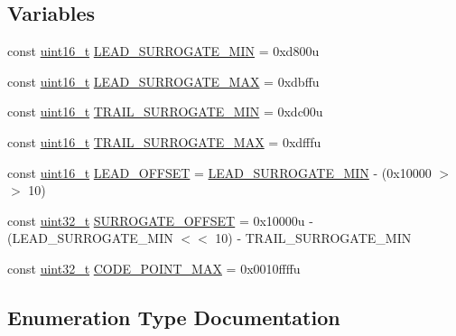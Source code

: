 \subsection*{Variables}
\begin{DoxyCompactItemize}
\item 
const \hyperlink{namespaceutf8_ac23066b92c5a1d9d9ef177201f750936}{uint16\+\_\+t} \hyperlink{namespaceutf8_1_1internal_aca9d84aa3b40e635b086c9ce843cc4a4}{L\+E\+A\+D\+\_\+\+S\+U\+R\+R\+O\+G\+A\+T\+E\+\_\+\+M\+IN} = 0xd800u
\item 
const \hyperlink{namespaceutf8_ac23066b92c5a1d9d9ef177201f750936}{uint16\+\_\+t} \hyperlink{namespaceutf8_1_1internal_af6038b4ebd9b71391eba050cc29720b8}{L\+E\+A\+D\+\_\+\+S\+U\+R\+R\+O\+G\+A\+T\+E\+\_\+\+M\+AX} = 0xdbffu
\item 
const \hyperlink{namespaceutf8_ac23066b92c5a1d9d9ef177201f750936}{uint16\+\_\+t} \hyperlink{namespaceutf8_1_1internal_a836088cf3e5e29ac9a89b2ffbd91623e}{T\+R\+A\+I\+L\+\_\+\+S\+U\+R\+R\+O\+G\+A\+T\+E\+\_\+\+M\+IN} = 0xdc00u
\item 
const \hyperlink{namespaceutf8_ac23066b92c5a1d9d9ef177201f750936}{uint16\+\_\+t} \hyperlink{namespaceutf8_1_1internal_a37212482f99986fc6aeaa95a9079c972}{T\+R\+A\+I\+L\+\_\+\+S\+U\+R\+R\+O\+G\+A\+T\+E\+\_\+\+M\+AX} = 0xdfffu
\item 
const \hyperlink{namespaceutf8_ac23066b92c5a1d9d9ef177201f750936}{uint16\+\_\+t} \hyperlink{namespaceutf8_1_1internal_a47b04bad75525ea9b01ff095c70fa081}{L\+E\+A\+D\+\_\+\+O\+F\+F\+S\+ET} = \hyperlink{namespaceutf8_1_1internal_aca9d84aa3b40e635b086c9ce843cc4a4}{L\+E\+A\+D\+\_\+\+S\+U\+R\+R\+O\+G\+A\+T\+E\+\_\+\+M\+IN} -\/ (0x10000 $>$$>$ 10)
\item 
const \hyperlink{namespaceutf8_a846259d2f173d524282583fc9d825b00}{uint32\+\_\+t} \hyperlink{namespaceutf8_1_1internal_a31ff17e602e8e7e15db5ebfb5e93a3fb}{S\+U\+R\+R\+O\+G\+A\+T\+E\+\_\+\+O\+F\+F\+S\+ET} = 0x10000u -\/ (\+L\+E\+A\+D\+\_\+\+S\+U\+R\+R\+O\+G\+A\+T\+E\+\_\+\+M\+I\+N $<$$<$ 10) -\/ T\+R\+A\+I\+L\+\_\+\+S\+U\+R\+R\+O\+G\+A\+T\+E\+\_\+\+M\+IN
\item 
const \hyperlink{namespaceutf8_a846259d2f173d524282583fc9d825b00}{uint32\+\_\+t} \hyperlink{namespaceutf8_1_1internal_a0a30055cabb6e5cefb5dafc8812cb123}{C\+O\+D\+E\+\_\+\+P\+O\+I\+N\+T\+\_\+\+M\+AX} = 0x0010ffffu
\end{DoxyCompactItemize}


\subsection{Enumeration Type Documentation}
